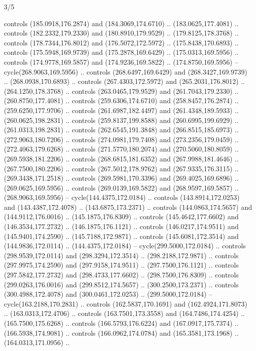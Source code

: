\begin{flagdescription}{3/5}
\begin{scope}[scale=0.00214\flagwidth,yshift=162mm]
\begin{scope}[y=-0.8pt, x=0.8pt, inner sep=0pt, outer sep=0pt]
\begin{scope}[draw,fill=gold,line join=round,line cap=round,line width=0.0025\flagwidth]
\begin{scope}[line width=0.0025\flagwidth]
controls (185.0918,176.2874) and (184.3069,174.6710) .. (183.0625,177.4081) ..
controls (182.2332,179.2330) and (180.8910,179.9529) .. (179.8125,178.3768) ..
controls (178.7344,176.8012) and (176.5072,172.5972) .. (175.8438,170.6893) ..
controls (175.5948,169.9739) and (175.2878,169.6429) .. (175.0313,169.5956) ..
controls (174.9778,169.5857) and (174.9236,169.5822) .. (174.8750,169.5956) --
cycle(268.9063,169.5956) .. controls (268.6497,169.6429) and
(268.3427,169.9739) .. (268.0938,170.6893) .. controls (267.4303,172.5972) and
(265.2031,176.8012) .. (264.1250,178.3768) .. controls (263.0465,179.9529) and
(261.7043,179.2330) .. (260.8750,177.4081) .. controls (259.6306,174.6710) and
(258.8457,176.2874) .. (259.6250,177.9706) .. controls (261.6987,182.4497) and
(261.4348,189.5933) .. (260.0625,198.2831) .. controls (259.8137,199.8588) and
(260.6995,199.6929) .. (261.0313,198.2831) .. controls (262.6545,191.3848) and
(266.8515,185.6973) .. (272.9063,180.7206) .. controls (274.0981,179.7408) and
(273.2356,179.0459) .. (272.4063,179.6268) .. controls (271.5770,180.2074) and
(270.5060,180.8059) .. (269.5938,181.2206) .. controls (268.6815,181.6352) and
(267.9988,181.4646) .. (267.7500,180.2206) .. controls (267.5012,178.9762) and
(267.9335,176.3115) .. (269.3438,171.2518) .. controls (269.5981,170.3396) and
(269.4025,169.6896) .. (269.0625,169.5956) .. controls (269.0139,169.5822) and
(268.9597,169.5857) .. (268.9063,169.5956) -- cycle(144.4375,172.0184) ..
controls (143.8914,172.0253) and (143.4387,172.4078) .. (143.6875,173.2371) ..
controls (144.0863,174.5657) and (144.9112,176.0016) .. (145.1875,176.8309) ..
controls (145.4642,177.6602) and (146.3534,177.2732) .. (146.1875,176.1121) ..
controls (146.0217,174.9511) and (145.9401,174.2590) .. (145.7188,172.9871) ..
controls (145.6081,172.3514) and (144.9836,172.0114) .. (144.4375,172.0184) --
cycle(299.5000,172.0184) .. controls (298.9539,172.0114) and
(298.3294,172.3514) .. (298.2188,172.9871) .. controls (297.9975,174.2590) and
(297.9158,174.9511) .. (297.7500,176.1121) .. controls (297.5842,177.2732) and
(298.4733,177.6602) .. (298.7500,176.8309) .. controls (299.0263,176.0016) and
(299.8512,174.5657) .. (300.2500,173.2371) .. controls (300.4988,172.4078) and
(300.0461,172.0253) .. (299.5000,172.0184) -- cycle(163.2188,170.2831) ..
controls (162.5837,170.1691) and (162.4924,171.8073) .. (163.0313,172.4706) ..
controls (163.7501,173.3558) and (164.7486,174.4254) .. (165.7500,175.6268) ..
controls (166.5793,176.6224) and (167.0917,175.7374) .. (166.5938,174.9081) ..
controls (166.0962,174.0784) and (165.3581,173.1968) .. (164.0313,171.0956) ..

\end{scope}
\end{scope}
\end{scope}
\end{scope}
\end{flagdescription}
